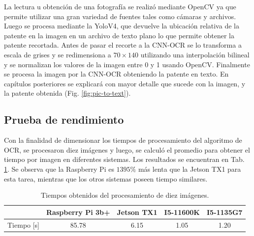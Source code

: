 La lectura u obtención de una fotografía se realizó mediante OpenCV \cite{opencv_opencv_2023} ya que permite utilizar una gran variedad de fuentes tales como cámaras y archivos. Luego se procesa mediante la YoloV4, que devuelve la ubicación relativa de la patente en la imagen en un archivo de texto plano lo que permite obtener la patente recortada. Antes de pasar el recorte a la CNN-OCR se lo transforma a escala de grises y se redimensiona a $70 \times 140$ utilizando una interpolación bilineal y se normalizan los valores de la imagen entre 0 y 1 usando OpenCV. Finalmente se procesa la imagen por la CNN-OCR obteniendo la patente en texto. En capítulos posteriores se explicará con mayor detalle que sucede con la imagen, y la patente obtenida (Fig. \ref{fig:pic-to-text}).


\subsection{Prueba de rendimiento}

Con la finalidad de dimensionar los tiempos de procesamiento del algoritmo de OCR, se procesaron diez imágenes y luego, se calculó el promedio para obtener el tiempo por imagen en diferentes sistemas. Los resultados se encuentran en Tab. \ref{tab:ocr}.
Se observa que la Raspberry Pi es $1395\%$ más lenta que la Jetson TX1 para esta tarea, mientras que los otros sistemas poseen tiempo similares.
\begin{table}
    \centering
    \begin{tabular}{ccccc}
        \toprule
                   & Raspberry Pi 3b+ & Jetson TX1 & I5-11600K & I5-1135G7 \\
        \midrule
        Tiempo [s] & 85.78            & 6.15       & 1.05      & 1.20      \\
        \bottomrule
    \end{tabular}
    \caption{Tiempos obtenidos del procesamiento de diez imágenes.}
    \label{tab:ocr}
\end{table}



